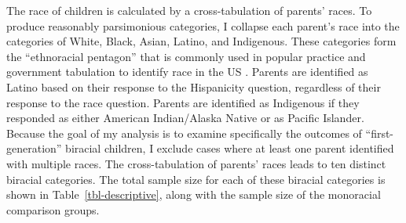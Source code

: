 \documentclass[
  12pt,
  letterpaper,
]{article}
\begin{document}
The race of children is calculated by a cross-tabulation of parents'
races. To produce reasonably parsimonious categories, I collapse each
parent's race into the categories of White, Black, Asian, Latino, and
Indigenous. These categories form the ``ethnoracial pentagon'' that is
commonly used in popular practice and government tabulation to identify
race in the US \autocite{hollinger_postethnic_1995}. Parents are
identified as Latino based on their response to the Hispanicity
question, regardless of their response to the race question. Parents are
identified as Indigenous if they responded as either American
Indian/Alaska Native or as Pacific Islander. Because the goal of my
analysis is to examine specifically the outcomes of ``first-generation''
biracial children, I exclude cases where at least one parent identified
with multiple races. The cross-tabulation of parents' races leads to ten
distinct biracial categories. The total sample size for each of these
biracial categories is shown in Table~\ref{tbl-descriptive}, along with
the sample size of the monoracial comparison groups.
\end{document}
